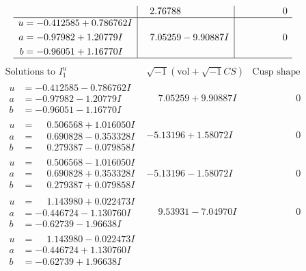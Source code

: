 \documentclass[1p]{elsarticle_modified}
\theoremstyle{definition}
\newcommand{\I}{\sqrt{-1}}
\begin{document}
$$\begin{array}{c|c|c}
 & \phantom{-}2.76788\phantom{ +0.000000I} & \phantom{-0.000000 } 0 \\ \hline\begin{aligned}
u &= -0.412585 + 0.786762 I \\
a &= -0.97982 + 1.20779 I \\
b &= -0.96051 + 1.16770 I\end{aligned}
 & \phantom{-}7.05259 - 9.90887 I & \phantom{-0.000000 } 0\\
 \hline 
 \end{array}$$\newpage$$\begin{array}{c|c|c}  
\text{Solutions to }I^u_{1}& \I (\text{vol} + \sqrt{-1}CS) & \text{Cusp shape}\\
 \hline 
\begin{aligned}
u &= -0.412585 - 0.786762 I \\
a &= -0.97982 - 1.20779 I \\
b &= -0.96051 - 1.16770 I\end{aligned}
 & \phantom{-}7.05259 + 9.90887 I & \phantom{-0.000000 } 0 \\ \hline\begin{aligned}
u &= \phantom{-}0.506568 + 1.016050 I \\
a &= \phantom{-}0.690828 - 0.353328 I \\
b &= \phantom{-}0.279387 - 0.079858 I\end{aligned}
 & -5.13196 + 1.58072 I & \phantom{-0.000000 } 0 \\ \hline\begin{aligned}
u &= \phantom{-}0.506568 - 1.016050 I \\
a &= \phantom{-}0.690828 + 0.353328 I \\
b &= \phantom{-}0.279387 + 0.079858 I\end{aligned}
 & -5.13196 - 1.58072 I & \phantom{-0.000000 } 0 \\ \hline\begin{aligned}
u &= \phantom{-}1.143980 + 0.022473 I \\
a &= -0.446724 - 1.130760 I \\
b &= -0.62739 - 1.96638 I\end{aligned}
 & \phantom{-}9.53931 - 7.04970 I & \phantom{-0.000000 } 0 \\ \hline\begin{aligned}
u &= \phantom{-}1.143980 - 0.022473 I \\
a &= -0.446724 + 1.130760 I \\
b &= -0.62739 + 1.96638 I\end{aligned}

\end{array}$$
\end{document}
